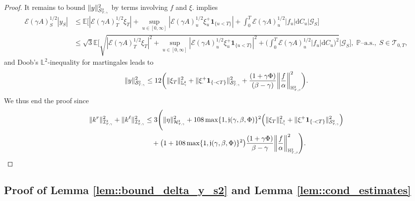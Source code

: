 \documentclass[10pt]{article} %
\newcommand\cE{\mathcal E}
\newcommand\cG{\mathcal G}
\newcommand\cH{\mathcal H}
\newcommand\cI{\mathcal I}
\newcommand\cS{\mathcal S}
\newcommand\cT{\mathcal T}
\newcommand{\smalltext}[1]{\text{\fontsize{4}{4}\selectfont$#1$}}
\def \E{\mathbb{E}}
\def \H{\mathbb{H}}
\def \L{\mathbb{L}}
\def \P{\mathbb{P}}
\newcommand{\1}{\mathbf{1}}
\def\d{\mathrm{d}}
\begin{document}
\begin{proof}
	It remains to bound $\|y\|^2_{\cS^\smalltext{2}_{\smalltext{T}\smalltext{,}\smalltext{\gamma}}}$ by terms involving $f$ and $\xi$.  implies
	\begin{align*}
		\cE(\gamma A)^{1/2}_S |y_S| 
		&\leq \E\bigg[ |\cE(\gamma A)^{1/2}_T\xi_T| + \sup_{u \in [0,\infty]}|\cE(\gamma A)^{1/2}_u \xi^+_u\mathbf{1}_{\{u < T\}}| + \int_0^T\cE(\gamma A)^{1/2}_u |f_u|\d C_u \bigg| \cG_S\bigg] \\
		&\leq \sqrt{3}\E\Bigg[ \sqrt{|\cE(\gamma A)^{1/2}_T\xi_T|^2 + \sup_{u \in [0,\infty]}|\cE(\gamma A)^{1/2}_u \xi^+_u\mathbf{1}_{\{u < T\}}|^2 + \bigg(\int_0^T\cE(\gamma A)^{1/2}_u |f_u|\d C_u\bigg)^2} \Bigg| \cG_S\Bigg], \; \text{$\P$--a.s.}, \; S \in \cT_{0,T},
	\end{align*}
	and Doob's $\L^2$-inequality for martingales leads to
	\begin{equation*}
		\|y\|^2_{\cS^\smalltext{2}_{\smalltext{T}\smalltext{,}\smalltext{\gamma}}} \leq 12 \bigg( \|\xi_T\|^2_{\L^\smalltext{2}_\smalltext{\gamma}} + \|\xi^+_\cdot\mathbf{1}_{\{\cdot < T\}}\|^2_{\cS^\smalltext{2}_{\smalltext{T}\smalltext{,}\smalltext{\gamma}}} + \frac{(1+\gamma\Phi)}{(\beta-\gamma)}\bigg\|\frac{f}{\alpha}\bigg\|^2_{\H^\smalltext{2}_{\smalltext{T}\smalltext{,}\smalltext{\beta}}} \bigg).
	\end{equation*}
	We thus end the proof since
	\begin{align*}
		\|k^r\|^2_{\cI^\smalltext{2}_{\smalltext{T}\smalltext{,}\smalltext{\gamma}}} + \|k^\ell\|^2_{\cI^\smalltext{2}_{\smalltext{T}\smalltext{,}\smalltext{\gamma}}} 
		&\leq 3 \Bigg( \|\eta\|^2_{\cH^\smalltext{2}_{\smalltext{T}\smalltext{,}\smalltext{\gamma}}} + 108 \max\{1, \mathfrak{j}(\gamma,\beta,\Phi)\}^2\Big(\|\xi_T\|^2_{\L^\smalltext{2}_\smalltext{\gamma}} + \|\xi^+_\cdot\mathbf{1}_{\{\cdot < T\}}\|^2_{\cS^\smalltext{2}_{\smalltext{T}\smalltext{,}\smalltext{\gamma}}} \Big) \\
		&\quad + \big(1+ 108 \max\{1, \mathfrak{j}(\gamma,\beta,\Phi)\}^2\big)\frac{(1+\gamma\Phi)}{\beta-\gamma}\bigg\|\frac{f}{\alpha}\bigg\|^2_{\H^\smalltext{2}_{\smalltext{T}\smalltext{,}\smalltext{\beta}}} \Bigg).
	\end{align*}
\end{proof}



\subsection{Proof of Lemma \ref{lem::bound_delta_y_s2} and Lemma \ref{lem::cond_estimates}}\label{subsec::proofs_tech_lemmas}
\end{document}
